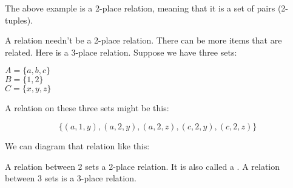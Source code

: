 \documentclass[../../../main.tex]{subfiles}
\begin{document}
\begin{center}\end{center}

\noindent
The above example is a 2-place relation, meaning that it is a set of pairs (2-tuples).

A relation needn't be a 2-place relation. There can be more items that are related. Here is a 3-place relation. Suppose we have three sets: 

\begin{center}
$A = \{ a, b, c \}$ \\
$B = \{ 1, 2 \}$ \\
$C = \{ x, y, z \}$
\end{center}

\noindent
A relation on these three sets might be this:

\begin{equation*}
\{ (a, 1, y), (a, 2, y), (a, 2, z), (c, 2, y), (c, 2, z ) \}
\end{equation*}

\noindent
We can diagram that relation like this:

\begin{center}\end{center}

\noindent
A relation between 2 sets a 2-place relation. It is also called a . A relation between 3 sets is a 3-place relation. 
\end{document}
